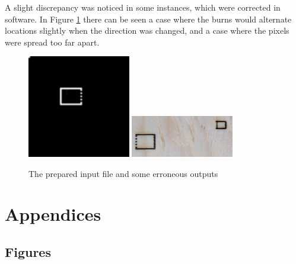 \documentclass[11pt]{LaTeX-Classes/math-hw}
\begin{document}
A slight discrepancy was noticed in some instances, which were corrected in software.
In Figure \ref{fig:off-by-one} there can be seen a case where the burns would alternate
locations slightly when the direction was changed, and a case where the pixels were
spread too far apart.
\begin{figure}[H]
  \begin{center}
    \includegraphics[width=0.4\textwidth]{test4}
    \includegraphics[width=0.4\textwidth]{burn-errors}
    \caption{The prepared input file and some erroneous outputs}
    \label{fig:off-by-one}
  \end{center}
\end{figure}

\section*{Appendices}
\subsection{Figures}
\end{document}
